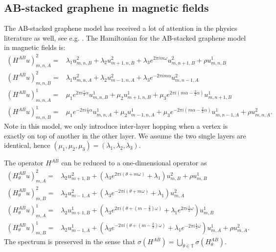 \documentclass[11pt]{amsart}
\newcommand{\T}{\mathbb T}
\begin{document}
\subsection{AB-stacked graphene in magnetic fields}
The AB-stacked graphene model has received a lot of attention in the physics literature as well, see e.g. \cite{LHCL}.
The Hamiltonian for the AB-stacked graphene model in magnetic fields is: 
\begin{align}
    (H^{AB}u)_{m,n,A}^2=&\lambda_1 u_{m,n,B}^2+\lambda_2 u_{m+1,n,B}^2+\lambda_3 e^{2\pi i m\omega} u_{m,n+1,B}^2+\rho u_{m,n,B}^1\\
    (H^{AB}u)_{m,n,B}^2=&\lambda_1 u_{m,n,A}^2+\lambda_2 u_{m-1,n,A}^2+\lambda_3 e^{-2\pi im\alpha}u_{m,n-1,A}^2\\
    (H^{AB}u)_{m,n,A}^1=&\mu_1 e^{2\pi i\frac{1}{3}\alpha}u_{m,n,B}^1+\mu_2 u_{m+1,n,B}^1+\mu_3 e^{2\pi i(m\alpha-\frac{2}{3}\alpha)}u_{m,n+1,B}^1\\
    (H^{AB}u)_{m,n,B}^1=&\mu_1 e^{-2\pi i \frac{1}{3}\alpha}u_{m,n,A}^1+\mu_2 u_{m-1,n,A}^1+\mu_3 e^{-2\pi i(m\alpha-\frac{2}{3}\alpha)}u_{m,n-1,A}^1+\rho u_{m,n,A}^2.
\end{align}
Note in this model, we only introduce inter-layer hopping when a vertex is exactly on top of another in the other layer.
We assume the two single layers are identical, hence $(\mu_1,\mu_2,\mu_3)=(\lambda_1,\lambda_2,\lambda_3)$.

The operator $H^{AB}$ can be reduced to a one-dimensional operator as
\begin{align}
    (H^{AB}_{\theta}u)_{m,A}^2=&\lambda_2 u_{m+1,B}^2+(\lambda_3 e^{2\pi i(\theta+m\omega)}+\lambda_1)u_{m,B}^2+ \rho u_{m,B}^1\\
    (H^{AB}_{\theta}u)_{m,B}^2=&\lambda_2 u_{m-1,A}^2+(\lambda_3 e^{-2\pi i(\theta+m\omega)}+\lambda_1)u_{m,A}^2\\
    (H^{AB}_{\theta}u)_{m,A}^1=&\lambda_2 u_{m+1,B}^1+(\lambda_3 e^{2\pi i(\theta+(m-\frac{2}{3})\omega)}+\lambda_1 e^{2\pi i\frac{1}{3}\omega})u_{m,B}^1\\
    (H^{AB}_{\theta}u)_{m,B}^1=&\lambda_2 u_{m-1,A}^1+(\lambda_3 e^{-2\pi i(\theta+(m-\frac{2}{3})\omega)}+\lambda_1 e^{-2\pi i\frac{1}{3}\omega})u_{m,A}^1+\rho u_{m,A}^2.
\end{align}
The spectrum is preserved in the sense that $\sigma(H^{AB})=\bigcup_{\theta\in \T}\sigma(H^{AB}_{\theta})$.
\end{document}
